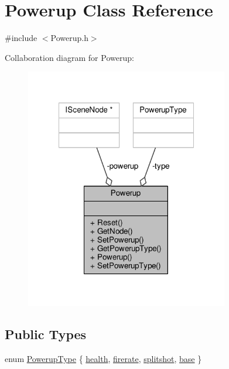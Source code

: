 \hypertarget{class_powerup}{\section{Powerup Class Reference}
\label{class_powerup}
}


{\ttfamily \#include $<$Powerup.\-h$>$}



Collaboration diagram for Powerup\-:
\nopagebreak
\begin{figure}[H]
\begin{center}
\leavevmode
\includegraphics[width=251pt]{class_powerup__coll__graph}
\end{center}
\end{figure}
\subsection*{Public Types}
\begin{DoxyCompactItemize}
\item 
enum \hyperlink{class_powerup_aaaae31c2cf5971eca7bd676279a5b468}{Powerup\-Type} \{ \hyperlink{class_powerup_aaaae31c2cf5971eca7bd676279a5b468a878d907a5fd684cac1a34d0a2d068f3c}{health}, 
\hyperlink{class_powerup_aaaae31c2cf5971eca7bd676279a5b468afdd5d90e6d9b69acebe1061c8b9a4845}{firerate}, 
\hyperlink{class_powerup_aaaae31c2cf5971eca7bd676279a5b468a10a2c0cad13fd5a1d5f35a7ac038c704}{splitshot}, 
\hyperlink{class_powerup_aaaae31c2cf5971eca7bd676279a5b468a5afdc5c454fa87d55a5476924c8a832a}{base}
 \}
\end{DoxyCompactItemize}
